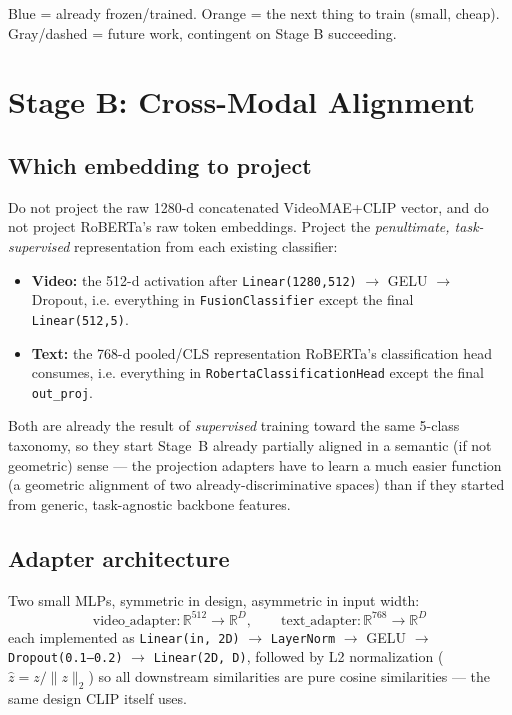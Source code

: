 \documentclass[11pt]{article}
\begin{document}
Blue = already frozen/trained. Orange = the next thing to train (small, cheap). Gray/dashed =
future work, contingent on Stage B succeeding.

\section{Stage B: Cross-Modal Alignment}

\subsection{Which embedding to project}
\label{sec:embedding-choice}
Do not project the raw 1280-d concatenated VideoMAE+CLIP vector, and do not project RoBERTa's raw
token embeddings. Project the \emph{penultimate, task-supervised} representation from each
existing classifier:

\begin{itemize}
\item \textbf{Video:} the 512-d activation after \texttt{Linear(1280,512)} $\to$ GELU $\to$
Dropout, i.e. everything in \texttt{FusionClassifier} except the final \texttt{Linear(512,5)}.
\item \textbf{Text:} the 768-d pooled/CLS representation RoBERTa's classification head consumes,
i.e. everything in \texttt{RobertaClassificationHead} except the final \texttt{out\_proj}.
\end{itemize}

Both are already the result of \emph{supervised} training toward the same 5-class taxonomy, so
they start Stage~B already partially aligned in a semantic (if not geometric) sense — the
projection adapters have to learn a much easier function (a geometric alignment of two
already-discriminative spaces) than if they started from generic, task-agnostic backbone
features.

\subsection{Adapter architecture}
Two small MLPs, symmetric in design, asymmetric in input width:
\[
\text{video\_adapter}: \mathbb{R}^{512} \to \mathbb{R}^{D}, \qquad
\text{text\_adapter}: \mathbb{R}^{768} \to \mathbb{R}^{D}
\]
each implemented as \texttt{Linear(in,~2D)} $\to$ \texttt{LayerNorm} $\to$ GELU $\to$
\texttt{Dropout(0.1--0.2)} $\to$ \texttt{Linear(2D,~D)}, followed by L2 normalization
($\hat{z} = z / \lVert z \rVert_2$) so all downstream similarities are pure cosine similarities —
the same design CLIP itself uses.
\end{document}
